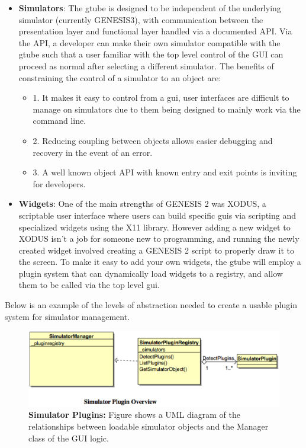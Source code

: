\documentclass[12pt]{article}
\begin{document}
\begin{itemize}
\item[] {\bf Simulators}: The gtube is designed to be independent of the underlying simulator (currently GENESIS3), with communication between the presentation layer and functional layer handled via a documented API. Via the API, a developer can make their own simulator compatible with the gtube such that a user familiar with the top level control of the GUI can proceed as normal after selecting a different simulator. The benefits of constraining the control of a simulator to an object are: 

	\begin{itemize}
		\item[] 1. It makes it easy to control from a gui, user interfaces are difficult to manage on simulators due to them being designed to mainly work via the command line.
		\item[] 2. Reducing coupling between objects allows easier debugging and recovery in the event of an error.
		\item[] 3. A well known object API with known entry and exit points is inviting for developers.
	\end{itemize}
		
	
\item[] {\bf Widgets}: One of the main strengths of GENESIS 2 was XODUS, a scriptable user interface where users can build specific guis via scripting and specialized widgets using the X11 library. However adding a new widget to XODUS isn't a job for someone new to programming, and running the newly created widget involved creating a GENESIS 2 script to properly draw it to the screen. To make it easy to add your own widgets, the gtube will employ a plugin system that can dynamically load widgets to a registry, and allow them to be called via the top level gui. 

\end{itemize}

Below is an example of the levels of abstraction needed to create a usable plugin system for simulator management.

\begin{figure}[ht]
   \centering
   \includegraphics[scale=0.6]{figures/SimulatorPluginOverview.eps}
   \caption{{\bf Simulator Plugins:} Figure shows a UML diagram of the relationships between loadable simulator objects and the Manager class of the GUI logic.}
   \label{fig:Simulator Plugin Overview}
\end{figure}
\end{document}
